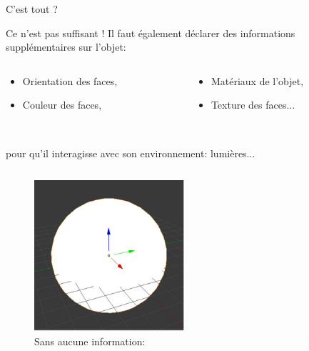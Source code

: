 \documentclass{beamer}
\begin{document}
\begin{frame}{C'est tout ?}
	\begin{block}{Ce n'est pas suffisant !}
		Il faut également déclarer des informations supplémentaires sur l'objet:
		\begin{columns}
			\begin{column}{0.5\textwidth}
				\begin{itemize}
					\item Orientation des faces,
					\item Couleur des faces,
				\end{itemize}
			\end{column}
			\begin{column}{0.5\textwidth}
				\begin{itemize}
					\item Matériaux de l'objet,
					\item Texture des faces...
				\end{itemize}			
			\end{column}
		\end{columns}
		~\\
		pour qu'il interagisse avec son environnement: lumières...
	\end{block}
	\begin{columns}
		\begin{column}{0.5\textwidth}
			\centering
			\begin{figure}
				\includegraphics[width=0.6\textwidth]{img/no_shade_sphere}
				\caption*{Sans aucune information:}
			\end{figure}
		\end{column}
		\begin{column}{0.5\textwidth}
			\centering
			\begin{figure}

\end{figure}
\end{column}
\end{columns}
\end{frame}
\end{document}

